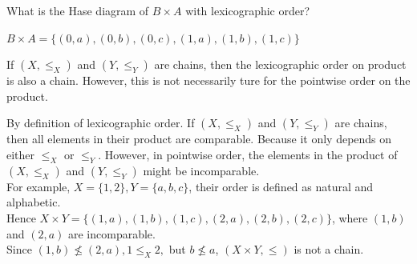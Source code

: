 \documentclass[11pt,a4paper]{exam}
\begin{document}
\begin{exo}
    What is the Hase diagram of $B \times A$ with lexicographic order?

    \begin{sol}
        $B \times A = \{(0,a), (0,b), (0,c), (1,a), (1,b), (1,c)\}$\\
    \end{sol}
\end{exo}

\begin{exo}
    If $(X, \leq_X)$ and $(Y, \leq_Y)$ are chains, then the lexicographic order on product is also a chain. However, this is not necessarily ture for the pointwise order on the product.

    \begin{sol}
        By definition of lexicographic order. If $(X, \leq_X)$ and $(Y, \leq_Y)$ are chains, then all elements in their product are comparable.
        Because it only depends on either $\leq_X$ or $\leq_Y$. However, in pointwise order, the elements in the product of $(X, \leq_X)$ and $(Y, \leq_Y)$ might be incomparable.\\ 
        For example, $X = \{1, 2\}, Y = \{a,b,c\}$, their order is defined as natural and alphabetic. \\
        Hence $X \times Y = \{(1,a),(1,b),(1,c),(2,a),(2,b),(2,c)\}$, where $(1,b)$ and $(2,a)$ are incomparable.\\ 
        Since $(1,b) \nleq (2,a), 1 \leq_X 2,$ but $b \nleq a$, $(X \times Y, \leq)$ is not a chain.        
    \end{sol}
\end{exo}
\end{document}
